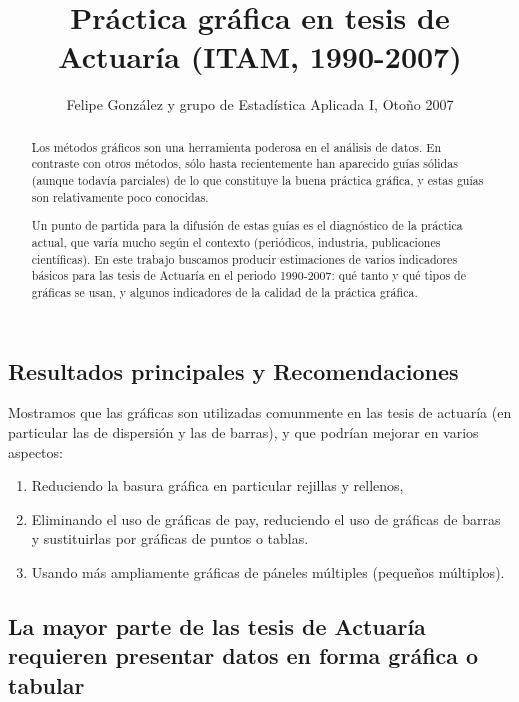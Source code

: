\documentclass{tufte-handout}\usepackage{graphicx, color}
\title{Práctica gráfica en tesis de Actuaría (ITAM, 1990-2007)}
\author{Felipe González y grupo de Estadística Aplicada I, Otoño 2007}
\begin{document}


\maketitle

\begin{abstract}
Los métodos gráficos
son una herramienta poderosa en
el análisis de datos. En contraste con otros métodos,
sólo hasta recientemente han aparecido guías sólidas
(aunque todavía parciales)
de lo que constituye la buena práctica gráfica,
y estas guías son relativamente poco conocidas.

Un punto de partida para la difusión de estas guías
es el diagnóstico de la práctica actual, que varía
mucho según el contexto (periódicos, industria,
publicaciones científicas). 
En este
trabajo buscamos producir estimaciones de
varios indicadores básicos para las tesis de Actuaría
en el periodo 1990-2007: qué tanto y qué tipos
de gráficas se usan, y 
algunos indicadores de la calidad de la práctica gráfica.


\end{abstract}





\subsection{Resultados principales y Recomendaciones}


Mostramos que las gráficas son
utilizadas comunmente en las tesis de actuaría (en particular
las de dispersión y las de barras),
y que podrían mejorar en varios aspectos: 

\begin{enumerate}
\item Reduciendo la basura gráfica en particular rejillas y rellenos,
\item Eliminando el uso de gráficas de pay, reduciendo el uso de gráficas
de barras y sustituirlas por gráficas de puntos o tablas.
\item Usando más ampliamente gráficas de páneles múltiples (pequeños
múltiplos).
\end{enumerate}


\subsection{La mayor parte de las tesis de Actuaría requieren presentar datos
en forma gráfica o tabular}
\end{document}
